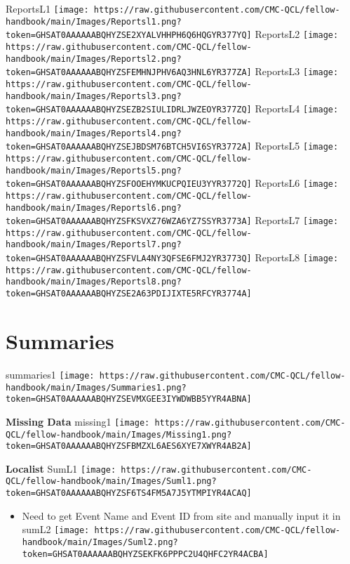 \documentclass[
]{book}
\providecommand{\tightlist}{%
  \setlength{\itemsep}{0pt}\setlength{\parskip}{0pt}}
\begin{document}
ReportsL1
\texttt{[image: https://raw.githubusercontent.com/CMC-QCL/fellow-handbook/main/Images/Reportsl1.png?token=GHSAT0AAAAAABQHYZSE2XYALVHHPH6Q6HQGYR377YQ]}
ReportsL2
\texttt{[image: https://raw.githubusercontent.com/CMC-QCL/fellow-handbook/main/Images/Reportsl2.png?token=GHSAT0AAAAAABQHYZSFEMHNJPHV6AQ3HNL6YR377ZA]}
ReportsL3
\texttt{[image: https://raw.githubusercontent.com/CMC-QCL/fellow-handbook/main/Images/Reportsl3.png?token=GHSAT0AAAAAABQHYZSEZB2SIULIDRLJWZEOYR377ZQ]}
ReportsL4
\texttt{[image: https://raw.githubusercontent.com/CMC-QCL/fellow-handbook/main/Images/Reportsl4.png?token=GHSAT0AAAAAABQHYZSEJBDSM76BTCH5VI6SYR3772A]}
ReportsL5
\texttt{[image: https://raw.githubusercontent.com/CMC-QCL/fellow-handbook/main/Images/Reportsl5.png?token=GHSAT0AAAAAABQHYZSFOOEHYMKUCPQIEU3YYR3772Q]}
ReportsL6
\texttt{[image: https://raw.githubusercontent.com/CMC-QCL/fellow-handbook/main/Images/Reportsl6.png?token=GHSAT0AAAAAABQHYZSFKSVXZ76WZA6YZ7SSYR3773A]}
ReportsL7
\texttt{[image: https://raw.githubusercontent.com/CMC-QCL/fellow-handbook/main/Images/Reportsl7.png?token=GHSAT0AAAAAABQHYZSFVLA4NY3QFSE6FMJ2YR3773Q]}
ReportsL8
\texttt{[image: https://raw.githubusercontent.com/CMC-QCL/fellow-handbook/main/Images/Reportsl8.png?token=GHSAT0AAAAAABQHYZSE2A63PDIJIXTE5RFCYR3774A]}

\hypertarget{summaries}{%
\section{Summaries}\label{summaries}}

summaries1
\texttt{[image: https://raw.githubusercontent.com/CMC-QCL/fellow-handbook/main/Images/Summaries1.png?token=GHSAT0AAAAAABQHYZSEVMXGEE3IYWDWBB5YYR4ABNA]}

\textbf{Missing Data}
missing1
\texttt{[image: https://raw.githubusercontent.com/CMC-QCL/fellow-handbook/main/Images/Missing1.png?token=GHSAT0AAAAAABQHYZSFBMZXL6AES6XYE7XWYR4AB2A]}

\textbf{Localist}
SumL1
\texttt{[image: https://raw.githubusercontent.com/CMC-QCL/fellow-handbook/main/Images/Suml1.png?token=GHSAT0AAAAAABQHYZSF6TS4FM5A7J5YTMPIYR4ACAQ]}

\begin{itemize}
\tightlist
\item
  Need to get Event Name and Event ID from site and manually input it in
  sumL2
  \texttt{[image: https://raw.githubusercontent.com/CMC-QCL/fellow-handbook/main/Images/Suml2.png?token=GHSAT0AAAAAABQHYZSEKFK6PPPC2U4QHFC2YR4ACBA]}
\end{itemize}
\end{document}
